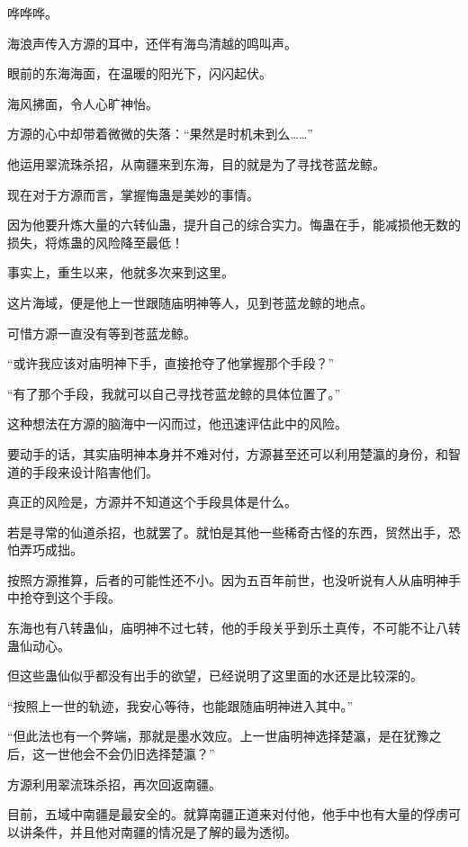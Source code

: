 
\begin{this_body}



哗哗哗。

海浪声传入方源的耳中，还伴有海鸟清越的鸣叫声。

眼前的东海海面，在温暖的阳光下，闪闪起伏。

海风拂面，令人心旷神怡。

方源的心中却带着微微的失落：“果然是时机未到么……”

他运用翠流珠杀招，从南疆来到东海，目的就是为了寻找苍蓝龙鲸。

现在对于方源而言，掌握悔蛊是美妙的事情。

因为他要升炼大量的六转仙蛊，提升自己的综合实力。悔蛊在手，能减损他无数的损失，将炼蛊的风险降至最低！

事实上，重生以来，他就多次来到这里。

这片海域，便是他上一世跟随庙明神等人，见到苍蓝龙鲸的地点。

可惜方源一直没有等到苍蓝龙鲸。

“或许我应该对庙明神下手，直接抢夺了他掌握那个手段？”

“有了那个手段，我就可以自己寻找苍蓝龙鲸的具体位置了。”

这种想法在方源的脑海中一闪而过，他迅速评估此中的风险。

要动手的话，其实庙明神本身并不难对付，方源甚至还可以利用楚瀛的身份，和智道的手段来设计陷害他们。

真正的风险是，方源并不知道这个手段具体是什么。

若是寻常的仙道杀招，也就罢了。就怕是其他一些稀奇古怪的东西，贸然出手，恐怕弄巧成拙。

按照方源推算，后者的可能性还不小。因为五百年前世，也没听说有人从庙明神手中抢夺到这个手段。

东海也有八转蛊仙，庙明神不过七转，他的手段关乎到乐土真传，不可能不让八转蛊仙动心。

但这些蛊仙似乎都没有出手的欲望，已经说明了这里面的水还是比较深的。

“按照上一世的轨迹，我安心等待，也能跟随庙明神进入其中。”

“但此法也有一个弊端，那就是墨水效应。上一世庙明神选择楚瀛，是在犹豫之后，这一世他会不会仍旧选择楚瀛？”

方源利用翠流珠杀招，再次回返南疆。

目前，五域中南疆是最安全的。就算南疆正道来对付他，他手中也有大量的俘虏可以讲条件，并且他对南疆的情况是了解的最为透彻。


\end{this_body}
